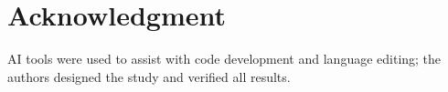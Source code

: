 \section*{Acknowledgment}
AI tools were used to assist with code development and language editing; the authors designed the study and verified all results.



